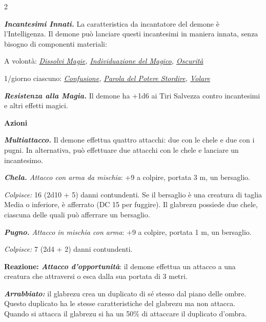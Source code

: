 \begin{multicols}{2}
{\emph{\textbf{Incantesimi Innati.}} La caratteristica da incantatore del demone è l'Intelligenza. Il demone può lanciare questi incantesimi in maniera innata, senza bisogno di componenti materiali:

A volontà: \emph{\hyperlink{Dissolvi Magie}{Dissolvi Magie}, \hyperlink{Individuazione del Magico}{Individuazione del Magico}, \hyperlink{Oscurità}{Oscurità}}

1/giorno ciascuno: \emph{\hyperlink{Confusione}{Confusione}, \hyperlink{Parola del Potere Stordire}{Parola del Potere Stordire}, \hyperlink{Volare}{Volare}}

\emph{\textbf{Resistenza alla Magia.}} Il demone ha +1d6 ai Tiri Salvezza contro incantesimi e altri effetti magici.

\textbf{Azioni}

\emph{\textbf{Multiattacco.}} Il demone effettua quattro attacchi: due con le chele e due con i pugni. In alternativa, può effettuare due attacchi con le chele e lanciare un incantesimo.

\emph{\textbf{Chela.} Attacco con arma da mischia}: +9 a colpire, portata 3 m, un bersaglio.

\emph{Colpisce:} 16 (2d10 + 5) danni contundenti. Se il bersaglio è una creatura di taglia Media o inferiore, è afferrato (DC 15 per fuggire). Il glabrezu possiede due chele, ciascuna delle quali può afferrare un bersaglio.

\emph{\textbf{Pugno.} Attacco in mischia con arma}: +9 a colpire, portata 1 m, un bersaglio.

\emph{Colpisce:} 7 (2d4 + 2) danni contundenti.

\textbf{Reazione: \emph{Attacco d'opportunità}}: il demone effettua un attacco a una creatura che attraversi o esca dalla sua portata di 3 metri.

\emph{\textbf{Arrabbiato:}} il glabrezu crea un duplicato di sé stesso dal piano delle ombre. Questo duplicato ha le stesse caratteristiche del glabrezu ma non attacca. Quando si attacca il glabrezu si ha un 50\% di attaccare il duplicato d'ombra.

}
\end{multicols}
